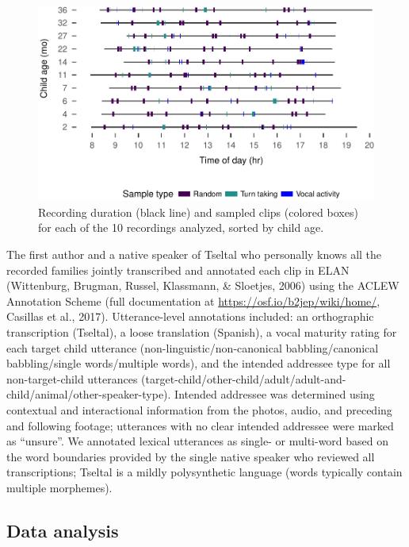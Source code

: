 \documentclass[floatsintext,man]{apa6}
\theoremstyle{definition}
\theoremstyle{definition}
\theoremstyle{definition}
\theoremstyle{remark}
\begin{document}
\begin{figure}
\centering
\includegraphics{Tseltal-CLE_files/figure-latex/fig2-1.pdf}
\caption{\label{fig:fig2}Recording duration (black line) and sampled clips
(colored boxes) for each of the 10 recordings analyzed, sorted by child
age.}
\end{figure}

The first author and a native speaker of Tseltal who personally knows
all the recorded families jointly transcribed and annotated each clip in
ELAN (Wittenburg, Brugman, Russel, Klassmann, \& Sloetjes, 2006) using
the ACLEW Annotation Scheme (full documentation at
\url{https://osf.io/b2jep/wiki/home/}, Casillas et al., 2017).
Utterance-level annotations included: an orthographic transcription
(Tseltal), a loose translation (Spanish), a vocal maturity rating for
each target child utterance (non-linguistic/non-canonical
babbling/canonical babbling/single words/multiple words), and the
intended addressee type for all non-target-child utterances
(target-child/other-child/adult/adult-and-child/animal/other-speaker-type).
Intended addressee was determined using contextual and interactional
information from the photos, audio, and preceding and following footage;
utterances with no clear intended addressee were marked as
\enquote{unsure}. We annotated lexical utterances as single- or
multi-word based on the word boundaries provided by the single native
speaker who reviewed all transcriptions; Tseltal is a mildly
polysynthetic language (words typically contain multiple morphemes).

\subsection{Data analysis}\label{methods-analysisinfo}
\end{document}
